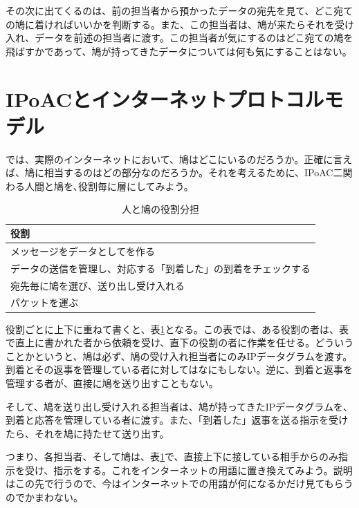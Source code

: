 その次に出てくるのは、前の担当者から預かったデータの宛先を見て、どこ宛ての鳩に着ければいいかを判断する。また、この担当者は、鳩が来たらそれを受け入れ、データを前述の担当者に渡す。この担当者が気にするのはどこ宛ての鳩を飛ばすかであって、鳩が持ってきたデータについては何も気にすることはない。




\section{IPoACとインターネットプロトコルモデル}
では、実際のインターネットにおいて、鳩はどこにいるのだろうか。正確に言えば、鳩に相当するのはどの部分なのだろうか。それを考えるために、IPoAC二関わる人間と鳩を､役割毎に層にしてみよう。
\begin{table}[hbtp] 			
\begin{center} \label{hatostack}
	\begin{tabular}{l}  \toprule
		役割 \\ \midrule
		メッセージをデータとしてを作る \\
		データの送信を管理し、対応する「到着した」の到着をチェックする \\
		宛先毎に鳩を選び、送り出し受け入れる \\
		パケットを運ぶ \\ \bottomrule
	\end{tabular}
\end{center} \caption{人と鳩の役割分担}
\end{table}

役割ごとに上下に重ねて書くと、表\ref{hatostack}となる。この表では、ある役割の者は、表で直上に書かれた者から依頼を受け、直下の役割の者に作業を任せる。どういうことかというと、鳩は必ず、鳩の受け入れ担当者にのみIPデータグラムを渡す。到着とその返事を管理している者に対してはなにもしない。逆に、到着と返事を管理する者が、直接に鳩を送り出すこともない。

そして、鳩を送り出し受け入れる担当者は、鳩が持ってきたIPデータグラムを、到着と応答を管理している者に渡す。また、「到着した」返事を送る指示を受けたら、それを鳩に持たせて送り出す。

つまり、各担当者、そして鳩は、表\ref{hatostack}で、直接上下に接している相手からのみ指示を受け、指示をする。これをインターネットの用語に置き換えてみよう。説明はこの先で行うので、今はインターネットでの用語が何になるかだけ見てもらうのでかまわない。

